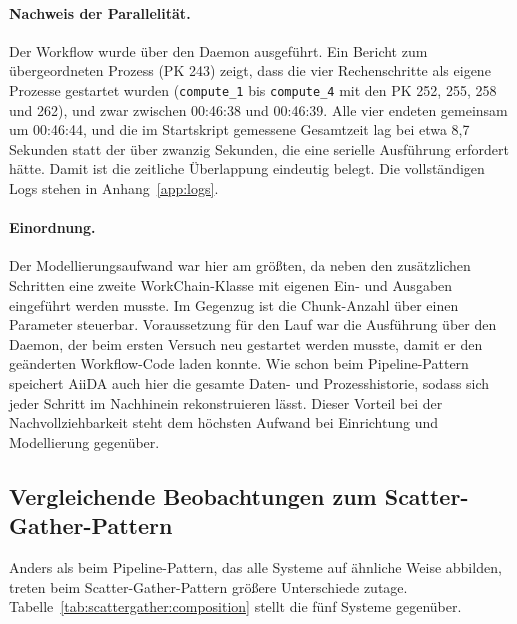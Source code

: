 \paragraph{Nachweis der Parallelität.}
Der Workflow wurde über den Daemon ausgeführt. Ein Bericht zum übergeordneten Prozess (PK 243)
zeigt, dass die vier Rechenschritte als eigene Prozesse gestartet wurden (\texttt{compute\_1} bis
\texttt{compute\_4} mit den PK 252, 255, 258 und 262), und zwar zwischen 00:46:38 und 00:46:39. Alle
vier endeten gemeinsam um 00:46:44, und die im Startskript gemessene Gesamtzeit lag bei etwa
8,7 Sekunden statt der über zwanzig Sekunden, die eine serielle Ausführung erfordert hätte. Damit
ist die zeitliche Überlappung eindeutig belegt. Die vollständigen Logs stehen in
Anhang~\ref{app:logs}.

\paragraph{Einordnung.}
Der Modellierungsaufwand war hier am größten, da neben den zusätzlichen Schritten eine zweite
WorkChain-Klasse mit eigenen Ein- und Ausgaben eingeführt werden musste. Im Gegenzug ist die
Chunk-Anzahl über einen Parameter steuerbar. Voraussetzung für den Lauf war die Ausführung über den
Daemon, der beim ersten Versuch neu gestartet werden musste, damit er den geänderten Workflow-Code
laden konnte. Wie schon beim Pipeline-Pattern speichert AiiDA auch hier die gesamte Daten- und
Prozesshistorie, sodass sich jeder Schritt im Nachhinein rekonstruieren lässt. Dieser Vorteil bei
der Nachvollziehbarkeit steht dem höchsten Aufwand bei Einrichtung und Modellierung gegenüber.

\subsection{Vergleichende Beobachtungen zum Scatter-Gather-Pattern}
\label{sec:practical:scattergather:comparison}

Anders als beim Pipeline-Pattern, das alle Systeme auf ähnliche Weise abbilden, treten beim
Scatter-Gather-Pattern größere Unterschiede zutage. Tabelle~\ref{tab:scattergather:composition}
stellt die fünf Systeme gegenüber.

